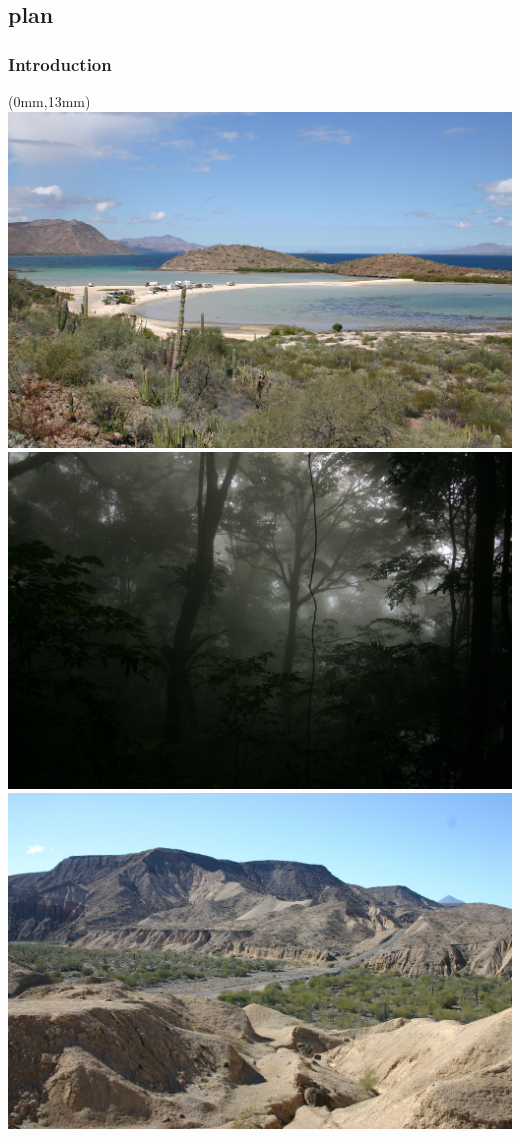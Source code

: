 \documentclass{beamer}
\begin{document}
\subsection{plan}
\begin{frame}
  \frametitle{Introduction}

  \begin{textblock*}{4.2cm}(0mm,13mm)%
    \includegraphics[width=\textwidth]{figs/random/desert5.jpg}\\[-2pt]
    \includegraphics[width=\textwidth]{figs/random/cr2.jpg}\\[-2pt]
    \includegraphics[width=\textwidth]{figs/random/desert2.jpg}
  \end{textblock*}


\end{frame}
\end{document}
